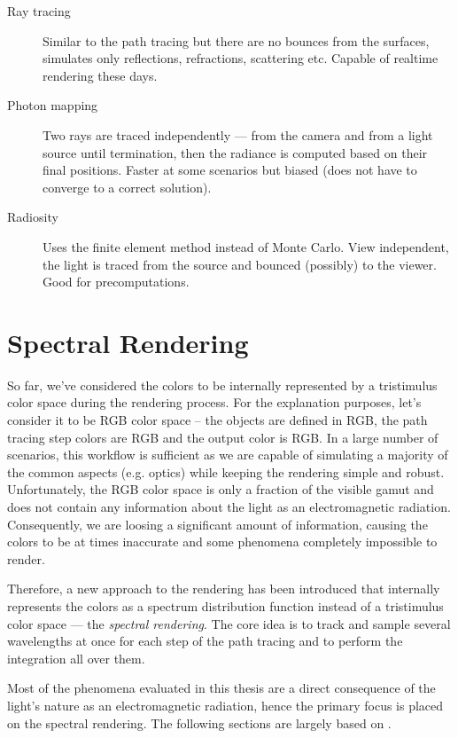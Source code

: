 \begin{description}
	\item[Ray tracing]\cite{glassner1989introduction} Similar to the path tracing but there are no bounces from the surfaces, simulates only reflections, refractions, scattering etc. Capable of realtime rendering these days.
	\item[Photon mapping]\cite{jensen2001realistic} Two rays are traced independently --- from the camera and from a light source until termination, then the radiance is computed based on their final positions. Faster at some scenarios but biased (does not have to converge to a correct solution).
	\item[Radiosity]\cite{sillion1994radiosity}Uses the finite element method instead of Monte Carlo. View independent, the light is traced from the source and bounced (possibly) to the viewer. Good for precomputations. 
\end{description}

\section{Spectral Rendering}

So far, we've considered the colors to be internally represented by a tristimulus color space during the rendering process. For the explanation purposes, let's consider it to be RGB color space -- the objects are defined in RGB, the path tracing step colors are RGB and the output color is RGB. In a large number of scenarios, this workflow is sufficient as we are capable of simulating a majority of the common aspects (e.g. optics) while keeping the rendering simple and robust. Unfortunately, the RGB color space is only a fraction of the visible gamut and does not contain any information about the light as an electromagnetic radiation. Consequently, we are loosing a significant amount of information, causing the colors to be at times inaccurate and some phenomena completely impossible to render. 

Therefore, a new approach to the rendering has been introduced that internally represents the colors as a spectrum distribution function instead of a tristimulus color space --- the \emph{spectral rendering}. The core idea is to track and sample several wavelengths at once for each step of the path tracing and to perform the integration all over them. 

Most of the phenomena evaluated in this thesis are a direct consequence of the light's nature as an electromagnetic radiation, hence the primary focus is placed on the spectral rendering.
The following sections are largely based on \citet{wilkie2002tone}.

